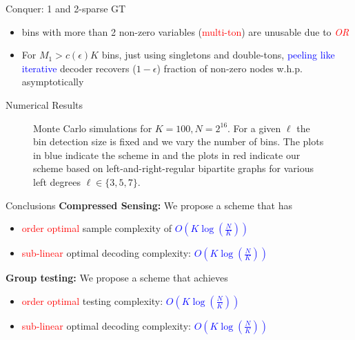 \documentclass[final]{beamer}
\newlength{\threecolwid}
\newlength{\blockskip}
\newlength{\paraskip}
\begin{document}
\begin{frame}
\begin{columns}[t]
\begin{column}{\threecolwid}
\begin{block}{\Large Conquer: 1 and 2-sparse GT}
\begin{itemize}
\begin{equation*}
\begin{bmatrix}
				    \end{bmatrix}
		        \end{equation*}
		      \item bins with more than 2 non-zero variables (\textcolor{red}{multi-ton}) are unusable due to \textcolor{red}{\textit{OR}}
		      \item For $M_1>c(\epsilon)K$ bins, just using singletons and double-tons, \textcolor{blue}{peeling like iterative} decoder recovers ($1-\epsilon$) fraction of non-zero nodes w.h.p. asymptotically
    	\end{itemize}
    \end{block}      

      \begin{block}{\Large Numerical Results}
		   \begin{figure}
     		  \centering
   			\scalebox{1.4}{}   
\caption{Monte Carlo simulations for $K=100, N=2^{16}$. For a given $\ell$ the bin detection size is fixed and we vary the number of bins. The plots in blue indicate the scheme in \cite{lee2015saffron} and the plots in red indicate our scheme based on left-and-right-regular bipartite graphs for various left degrees $\ell\in\{3,5,7\}$.}
			\end{figure}    
      \end{block}  
      

         \begin{alertblock}{\Large Conclusions} 
	    \textbf{Compressed Sensing:} We propose a scheme that has
			\begin{itemize}
			\itemsep10pt
				\item \textcolor{red}{order optimal} sample complexity of \textcolor{blue}{$O(K\log (\frac{N}{K}))$}
				\item \textcolor{red}{sub-linear} optimal decoding complexity: \textcolor{blue}{$O(K\log (\frac{N}{K}))$}
			\end{itemize} 
\vspace{\paraskip}    
  
   \textbf{Group testing:} We propose a scheme that achieves
		\begin{itemize}
		\itemsep10pt
			\item \textcolor{red}{order optimal} testing complexity: \textcolor{blue}{$O(K\log (\frac{N}{K}))$}
			\item \textcolor{red}{sub-linear} optimal decoding complexity: \textcolor{blue}{$O(K\log (\frac{N}{K}))$}
		\end{itemize} 
    \end{alertblock}
\vspace{-\paraskip}    


\end{column}
\end{columns}
\end{frame}
\end{document}
